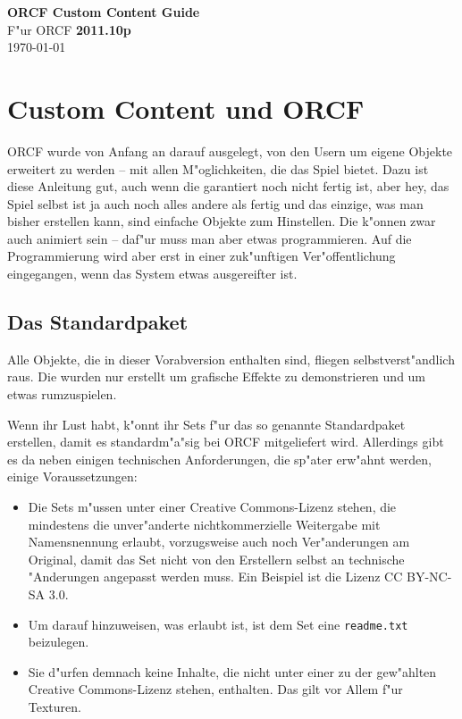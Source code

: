 \documentclass[a4paper]{article}
\newcommand{\cfile}[1]{\texttt{#1}}
\begin{document}
\pagestyle{fancy}
\fancyhf{}
\fancyfoot[R]{\huge{\thepage}}

\vspace*{\fill}
\begin{center}
  \Huge{\textbf{ORCF Custom Content Guide}} \\
  \vspace{2cm}
  \large{F"ur ORCF \textbf{2011.10p}} \\
  \vspace{1cm}
  \large{\today}
  \vspace{3cm}
\end{center}
\vfill

\newpage

\tableofcontents

\newpage

\section{Custom Content und ORCF}
ORCF wurde von Anfang an darauf ausgelegt, von den Usern um eigene Objekte erweitert zu werden -- mit allen M"oglichkeiten, die das Spiel bietet. Dazu ist
diese Anleitung gut, auch wenn die garantiert noch nicht fertig ist, aber hey, das Spiel selbst ist ja auch noch alles andere als fertig und das einzige,
was man bisher erstellen kann, sind einfache Objekte zum Hinstellen. Die k"onnen zwar auch animiert sein -- daf"ur muss man aber etwas programmieren. Auf
die Programmierung wird aber erst in einer zuk"unftigen Ver"offentlichung eingegangen, wenn das System etwas ausgereifter ist.

\subsection{Das Standardpaket}
Alle Objekte, die in dieser Vorabversion enthalten sind, fliegen selbstverst"andlich raus. Die wurden nur erstellt um grafische Effekte zu demonstrieren
und um etwas rumzuspielen.

Wenn ihr Lust habt, k"onnt ihr Sets f"ur das so genannte Standardpaket erstellen, damit es standardm"a"sig bei ORCF mitgeliefert wird. Allerdings gibt es
da neben einigen technischen Anforderungen, die sp"ater erw"ahnt werden, einige Voraussetzungen:
\begin{itemize}
\item
  Die Sets m"ussen unter einer Creative Commons-Lizenz stehen, die mindestens die unver"anderte nichtkommerzielle Weitergabe mit Namensnennung erlaubt,
  vorzugsweise auch noch Ver"anderungen am Original, damit das Set nicht von den Erstellern selbst an technische "Anderungen angepasst werden muss. Ein
  Beispiel ist die Lizenz CC BY-NC-SA 3.0.
\item
  Um darauf hinzuweisen, was erlaubt ist, ist dem Set eine \cfile{readme.txt} beizulegen.
\item
  Sie d"urfen demnach keine Inhalte, die nicht unter einer zu der gew"ahlten Creative Commons-Lizenz stehen, enthalten. Das gilt vor Allem f"ur Texturen.
\end{itemize}
\end{document}
